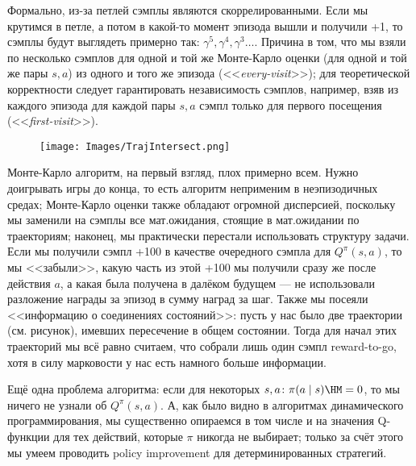 \begin{remark}
Формально, из-за петлей сэмплы являются скоррелированными. Если мы крутимся в петле, а потом в какой-то момент эпизода вышли и получили +1, то сэмплы будут выглядеть примерно так: $\gamma^5, \gamma^4, \gamma^3 \dots$. Причина в том, что мы взяли по несколько сэмплов для одной и той же Монте-Карло оценки (для одной и той же пары $s, a$) из одного и того же эпизода (<<\emph{every-visit}>>); для теоретической корректности следует гарантировать независимость сэмплов, например, взяв из каждого эпизода для каждой пары $s, a$ сэмпл только для первого посещения (<<\emph{first-visit}>>).
\end{remark}

\begin{wrapfigure}{l}{0.35\textwidth}
\vspace{-0.3cm}
\centering
\texttt{[image: Images/TrajIntersect.png]}
\vspace{-0.3cm}
\end{wrapfigure}

Монте-Карло алгоритм, на первый взгляд, плох примерно всем. Нужно доигрывать игры до конца, то есть алгоритм неприменим в неэпизодичных средах; Монте-Карло оценки также обладают огромной дисперсией, поскольку мы заменили на сэмплы все мат.ожидания, стоящие в мат.ожидании по траекториям; наконец, мы практически перестали использовать структуру задачи. Если мы получили сэмпл +100 в качестве очередного сэмпла для $Q^{\pi}(s, a)$, то мы <<забыли>>, какую часть из этой +100 мы получили сразу же после действия $a$, а какая была получена в далёком будущем --- не использовали разложение награды за эпизод в сумму наград за шаг. Также мы посеяли <<информацию о соединениях состояний>>: пусть у нас было две траектории (см. рисунок), имевших пересечение в общем состоянии. Тогда для начал этих траекторий мы всё равно считаем, что собрали лишь один сэмпл reward-to-go, хотя в силу марковости у нас есть намного больше информации.

Ещё одна проблема алгоритма: если для некоторых $s, a \colon \pi(a \mid s) \HM= 0$, то мы ничего не узнали об $Q^\pi(s, a)$. А, как было видно в алгоритмах динамического программирования, мы существенно опираемся в том числе и на значения Q-функции для тех действий, которые $\pi$ никогда не выбирает; только за счёт этого мы умеем проводить policy improvement для детерминированных стратегий.

